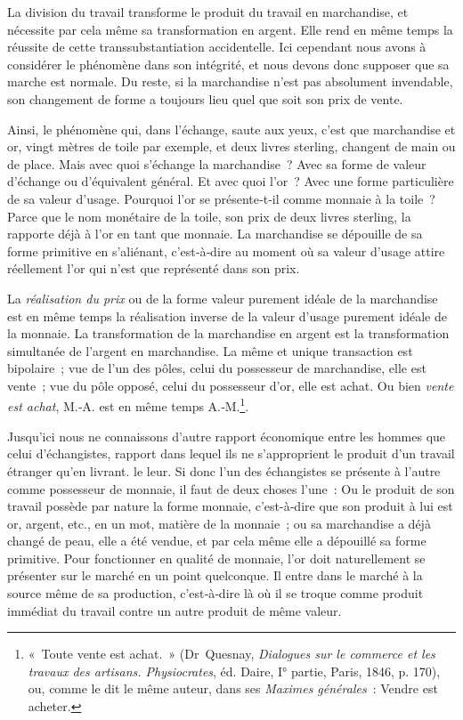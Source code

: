 \documentclass[french,twoside]{book} %
\begin{document}
La division du travail transforme le produit du travail en marchandise, et nécessite par cela même sa transformation en argent. Elle rend en même temps la réussite de cette transsubstantiation accidentelle. Ici cependant nous avons à considérer le phénomène dans son intégrité, et nous devons donc supposer que sa marche est normale. Du reste, si la marchandise n’est pas absolument invendable, son changement de forme a toujours lieu quel que soit son prix de vente.\par
Ainsi, le phénomène qui, dans l’échange, saute aux yeux, c’est que marchandise et or, vingt mètres de toile par exemple, et deux livres sterling, changent de main ou de place. Mais avec quoi s’échange la marchandise ? Avec sa forme de valeur d’échange ou d’équivalent général. Et avec quoi l’or ? Avec une forme particulière de sa valeur d’usage. Pourquoi l’or se présente‑t‑il comme monnaie à la toile ? Parce que le nom monétaire de la toile, son prix de deux livres sterling, la rapporte déjà à l’or en tant que monnaie. La marchandise se dépouille de sa forme primitive en s’aliénant, c’est‑à‑dire au moment où sa valeur d’usage attire réellement l’or qui n’est que représenté dans son prix.\par
La \emph{réalisation du prix} ou de la forme valeur purement idéale de la marchandise est en même temps la réalisation inverse de la valeur d’usage purement idéale de la monnaie. La transformation de la marchandise en argent est la transformation simultanée de l’argent en marchandise. La même et unique transaction est bipolaire ; vue de l’un des pôles, celui du possesseur de marchandise, elle est vente ; vue du pôle opposé, celui du possesseur d’or, elle est achat. Ou bien \emph{vente est achat}, M.‑A. est en même temps A.‑M.\footnote{« Toute vente est achat. » (Dr Quesnay, \emph{Dialogues sur le commerce et les travaux des artisans. Physiocrates}, éd. Daire, I° partie, Paris, 1846, p. 170), ou, comme le dit le même auteur, dans ses \emph{Maximes générales} : Vendre est acheter.}.\par
Jusqu’ici nous ne connaissons d’autre rapport économique entre les hommes que celui d’échangistes, rapport dans lequel ils ne s’approprient le produit d’un travail étranger qu’en livrant. le leur. Si donc l’un des échangistes se présente à l’autre comme possesseur de monnaie, il faut de deux choses l’une : Ou le produit de son travail possède par nature la forme monnaie, c’est-à‑dire que son produit à lui est or, argent, etc., en un mot, matière de la monnaie ; ou sa marchandise a déjà changé de peau, elle a été vendue, et par cela même elle a dépouillé sa forme primitive. Pour fonctionner en qualité de monnaie, l’or doit naturellement se présenter sur le marché en un point quelconque. Il entre dans le marché à la source même de sa production, c’est‑à‑dire là où il se troque comme produit immédiat du travail contre un autre produit de même valeur.\par
\end{document}
